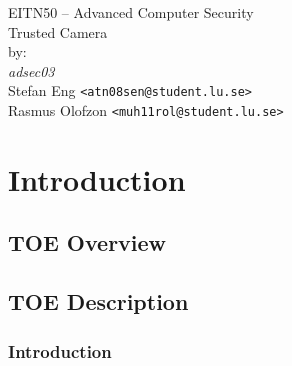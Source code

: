 \documentclass[10pt]{article}
\newcommand{\comm}[1]{{\leavevmode\color{gray}#1}}
\begin{document}

  \thispagestyle{empty}
  \vspace*{3cm}
  \begin{center}
    \huge{EITN50 -- Advanced Computer Security} \\
    \vspace{0.3cm}
    \LARGE{Trusted Camera} \\
    \vspace{1cm}
    \large{by: \\ \vspace{0.2cm}
	\textit{adsec03} \\
        Stefan Eng \texttt{<atn08sen@student.lu.se>} \\
        Rasmus Olofzon \texttt{<muh11rol@student.lu.se>}
        } \\
  \end{center}


  \newpage

  \section{Introduction}

%

    \subsection{TOE Overview}
    \subsection{TOE Description}
      \subsubsection{Introduction}
\end{document}
